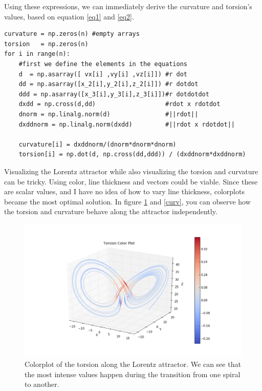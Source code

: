 \documentclass[a4paper,10pt]{article}
\begin{document}
Using these expressions, we can immediately derive the curvature and torsion's values, based on equation \ref{eq1} and \ref{eq2}.
\begin{lstlisting}
curvature = np.zeros(n) #empty arrays
torsion   = np.zeros(n)
for i in range(n):
    #first we define the elements in the equations
    d  = np.asarray([ vx[i] ,vy[i] ,vz[i]]) #r dot
    dd = np.asarray([x_2[i],y_2[i],z_2[i]]) #r dotdot
    ddd = np.asarray([x_3[i],y_3[i],z_3[i]])#r dotdotdot
    dxdd = np.cross(d,dd)                   #rdot x rdotdot
    dnorm = np.linalg.norm(d)               #||rdot||
    dxddnorm = np.linalg.norm(dxdd)         #||rdot x rdotdot|| 
    
    curvature[i] = dxddnorm/(dnorm*dnorm*dnorm)
    torsion[i] = np.dot(d, np.cross(dd,ddd)) / (dxddnorm*dxddnorm)
\end{lstlisting}
Visualizing the Lorentz attractor while also visualizing the torsion and curvature can be tricky. Using color, line thickness and vectors could be viable.
Since these are scalar values, and I have no idea of how to vary line thickness, colorplots became the most optimal solution. In figure \ref{torso} and \ref{curv}, you can observe how the 
torsion and curvature behave along the attractor independently.
\begin{figure}
 \centering
 \includegraphics[width=\linewidth]{torso}
 \caption{Colorplot of the torsion along the Lorentz attractor. We can see that the most intense values happen during the transition from one spiral to another.}
  \label{torso}

\end{figure}
\end{document}
